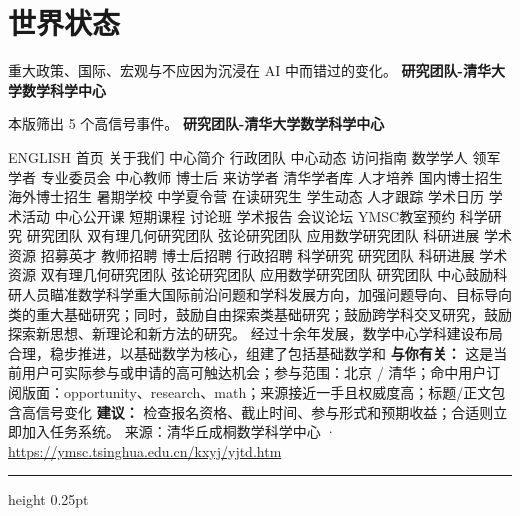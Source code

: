 \documentclass[10.5pt]{ctexart}
\begin{document}
\section*{世界状态}
{\color{ormuted} 重大政策、国际、宏观与不应因为沉浸在 AI 中而错过的变化。}
\vspace{2mm}
{\LARGE\bfseries 研究团队-清华大学数学科学中心}\par
\vspace{1mm}
{\color{ormuted} 本版筛出 5 个高信号事件。}
\vspace{3mm}
{\Large\bfseries 研究团队-清华大学数学科学中心}\par
ENGLISH 首页 关于我们 中心简介 行政团队 中心动态 访问指南 数学学人 领军学者 专业委员会 中心教师 博士后 来访学者 清华学者库 人才培养 国内博士招生 海外博士招生 暑期学校 中学夏令营 在读研究生 学生动态 人才跟踪 学术日历 学术活动 中心公开课 短期课程 讨论班 学术报告 会议论坛 YMSC教室预约 科学研究 研究团队 双有理几何研究团队 弦论研究团队 应用数学研究团队 科研进展 学术资源 招募英才 教师招聘 博士后招聘 行政招聘 科学研究 研究团队 科研进展 学术资源 双有理几何研究团队 弦论研究团队 应用数学研究团队 研究团队 中心鼓励科研人员瞄准数学科学重大国际前沿问题和学科发展方向，加强问题导向、目标导向类的重大基础研究；同时，鼓励自由探索类基础研究；鼓励跨学科交叉研究，鼓励探索新思想、新理论和新方法的研究。 经过十余年发展，数学中心学科建设布局合理，稳步推进，以基础数学为核心，组建了包括基础数学和
\textbf{与你有关：} 这是当前用户可实际参与或申请的高可触达机会；参与范围：北京 / 清华；命中用户订阅版面：opportunity、research、math；来源接近一手且权威度高；标题/正文包含高信号变化
\textbf{建议：} 检查报名资格、截止时间、参与形式和预期收益；合适则立即加入任务系统。
{\footnotesize\color{ormuted} 来源：清华丘成桐数学科学中心 · \url{https://ymsc.tsinghua.edu.cn/kxyj/yjtd.htm}}
\vspace{4mm}
\hrule height 0.25pt
\vspace{3mm}
\end{document}
